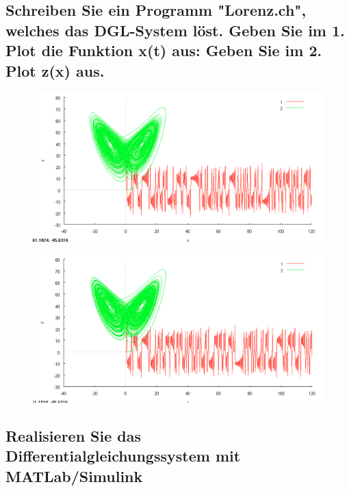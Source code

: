 \documentclass[10pt,a4paper]{article}
\begin{document}
\subsection{Schreiben Sie ein Programm "Lorenz.ch", welches das DGL-System löst.
Geben Sie im 1. Plot die Funktion x(t) aus:
Geben Sie im 2. Plot z(x) aus.}

\begin{figure}[H]
\centering
\includegraphics[width=0.9\linewidth]{../screenshots/lorenz.png}
\end{figure}

\begin{figure}[H]
\centering
\includegraphics[width=0.9\linewidth]{../screenshots/lorenz000001.png}
\end{figure}


\subsection{Realisieren Sie das Differentialgleichungssystem mit MATLab/Simulink}
\end{document}
